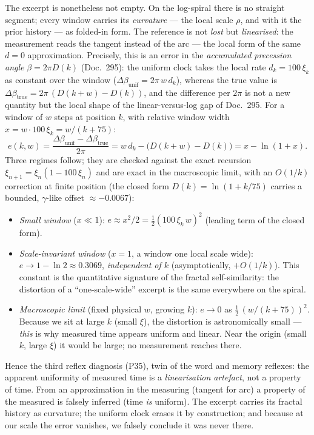The excerpt is nonetheless not empty. On the log-spiral there is no straight segment; every
window carries its \emph{curvature} --- the local scale $\rho$, and with it the prior history
--- as folded-in form. The reference is not \emph{lost} but \emph{linearised}: the
measurement reads the tangent instead of the arc --- the local form of the same $d=0$
approximation. Precisely, this is an error in the \emph{accumulated precession angle}
$\beta = 2\pi D(k)$ (Doc.~295): the uniform clock takes the local rate $d_k = 100\,\xi_k$ as
constant over the window ($\Delta\beta_{\text{unif}} = 2\pi\,w\,d_k$), whereas the true value
is $\Delta\beta_{\text{true}} = 2\pi\,(D(k{+}w)-D(k))$, and the difference per $2\pi$ is not a
new quantity but the local shape of the linear-versus-log gap of Doc.~295. For a window of
$w$ steps at position $k$, with relative window width $x = w\cdot 100\,\xi_k = w/(k+75)$:
\begin{equation}
e(k,w) = \frac{\Delta\beta_{\text{unif}} - \Delta\beta_{\text{true}}}{2\pi}
       = w\,d_k - \big(D(k{+}w)-D(k)\big) = x - \ln(1+x).
\end{equation}
Three regimes follow; they are checked against the exact recursion
$\xi_{n+1}=\xi_n(1-100\,\xi_n)$ and are exact in the macroscopic limit, with an $O(1/k)$
correction at finite position (the closed form $D(k)=\ln(1+k/75)$ carries a bounded,
$\gamma$-like offset $\approx-0.0067$):
\begin{itemize}
\item \emph{Small window} ($x\ll1$): $e \approx x^2/2 = \tfrac12(100\,\xi_k\,w)^2$ (leading
term of the closed form).
\item \emph{Scale-invariant window} ($x=1$, a window one local scale wide): $e \to 1-\ln 2
\approx 0.3069$, \emph{independent of $k$} (asymptotically, $+O(1/k)$). This constant is the
quantitative signature of the fractal self-similarity: the distortion of a
\enquote{one-scale-wide} excerpt is the same everywhere on the spiral.
\item \emph{Macroscopic limit} (fixed physical $w$, growing $k$): $e \to 0$ as
$\tfrac12\,(w/(k+75))^2$. Because we sit at large $k$ (small $\xi$), the distortion is
astronomically small --- \emph{this} is why measured time appears uniform and linear. Near the
origin (small $k$, large $\xi$) it would be large; no measurement reaches there.
\end{itemize}

Hence the third reflex diagnosis (P35), twin of the word and memory reflexes: the apparent
uniformity of measured time is a \emph{linearisation artefact}, not a property of time. From
an approximation in the measuring (tangent for arc) a property of the measured is falsely
inferred (time \emph{is} uniform). The excerpt carries its fractal history as curvature; the
uniform clock erases it by construction; and because at our scale the error vanishes, we
falsely conclude it was never there.

